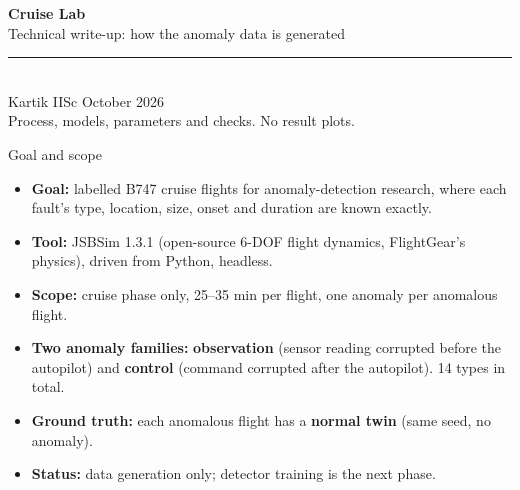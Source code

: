 \documentclass[aspectratio=169,11pt]{beamer}
\newcommand{\obs}[1]{{\color{flight}\textbf{#1}}}
\newcommand{\ctl}[1]{{\color{twin}\textbf{#1}}}
\newcommand{\aside}[1]{{\color{muted}\small #1}}
\begin{document}
\begin{frame}[plain]
  \vspace{2.5em}
  {\Huge\bfseries Cruise Lab}\\[0.6em]
  {\Large Technical write-up: how the anomaly data is generated}\\[1.4em]
  {\color{flight}\rule{3cm}{2pt}}\\[1em]
  Kartik \quad\textbullet\quad IISc \quad\textbullet\quad October 2026\\[2.5em]
  \aside{Process, models, parameters and checks. No result plots.}
\end{frame}

\begin{frame}{Goal and scope}
  \begin{itemize}\setlength\itemsep{0.7em}
    \item \textbf{Goal:} labelled B747 cruise flights for anomaly-detection research, where each fault's type, location, size, onset and duration are known exactly.
    \item \textbf{Tool:} JSBSim 1.3.1 (open-source 6-DOF flight dynamics, FlightGear's physics), driven from Python, headless.
    \item \textbf{Scope:} cruise phase only, 25--35 min per flight, one anomaly per anomalous flight.
    \item \textbf{Two anomaly families:} \obs{observation} (sensor reading corrupted before the autopilot) and \ctl{control} (command corrupted after the autopilot). 14 types in total.
    \item \textbf{Ground truth:} each anomalous flight has a \textbf{normal twin} (same seed, no anomaly).
    \item \textbf{Status:} data generation only; detector training is the next phase.
  \end{itemize}
\end{frame}
\end{document}
